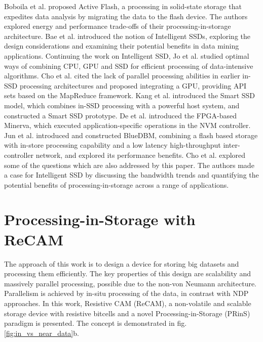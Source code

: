 \documentclass{superfri}
\begin{document}
	
	Boboila et al. \cite{boboila2012active} proposed Active Flash, a processing in solid-state storage that expedites data analysis by migrating the data to the flash device. The authors explored energy and performance trade-offs of their processing-in-storage architecture. Bae et al. \cite{bae2013intelligent} introduced the notion of Intelligent SSDs, exploring the design considerations and examining their potential benefits in data mining applications. Continuing the work on Intelligent SSD, Jo et al. \cite{jo2016collaborative} studied optimal ways of combining CPU, GPU and SSD for efficient processing of data-intensive algorithms. Cho et al. \cite{cho2013xsd} cited the lack of parallel processing abilities in earlier in-SSD processing architectures and proposed integrating a GPU, providing API sets based on the MapReduce framework. Kang et al. \cite{kang2013enabling} introduced the Smart SSD model, which combines in-SSD processing with a powerful host system, and constructed a Smart SSD prototype. De et al. \cite{de2013minerva} introduced the FPGA-based Minerva, which executed application-specific operations in the NVM controller. Jun et al. \cite{jun2015bluedbm} introduced and constructed BlueDBM, combining a flash based storage with in-store processing capability and a low latency high-throughput inter-controller network, and explored its performance benefits. Cho et al. \cite{cho2013active} explored some of the questions which are also addressed by this paper. The authors made a case for Intelligent SSD by discussing the bandwidth trends and quantifying the potential benefits of processing-in-storage across a range of applications.
	
	
	\section{Processing-in-Storage with ReCAM}
	\label{sec:PRinS_with_ReCAM}
	
	The approach of this work is to design a device for storing big datasets and processing them efficiently. The key properties of this design are scalability and massively parallel processing, possible due to the non-von Neumann architecture. Parallelism is achieved by in-situ processing of the data, in contrast with NDP approaches. In this work, Resistive CAM (ReCAM), a non-volatile and scalable storage device with resistive bitcells and a novel Processing-in-Storage (PRinS) paradigm is presented. The concept is demonstrated in fig. \ref{fig:in_vs_near_data}b.
	
\end{document}
